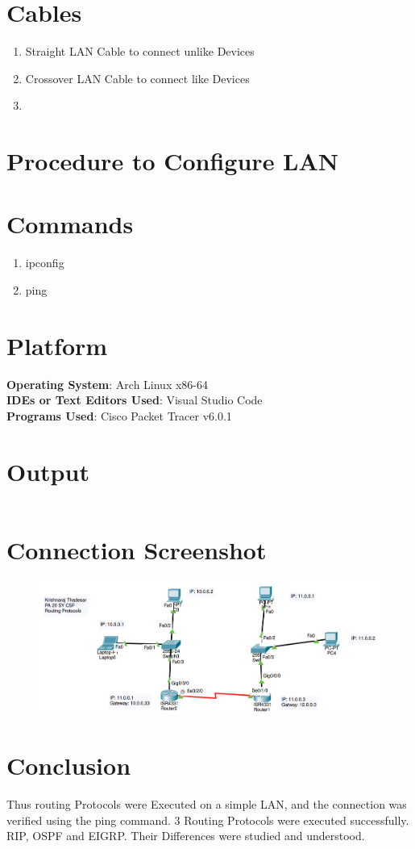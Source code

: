 \documentclass[11pt]{article}
\begin{document}
\section{Cables}
\begin{enumerate}
	\item Straight LAN Cable to connect unlike Devices
	\item Crossover LAN Cable to connect like Devices
	\item 
\end{enumerate}

\section{Procedure to Configure LAN}


\section{Commands}

\begin{enumerate}
	\item ipconfig
	\item ping
\end{enumerate}

\section{Platform}
	\textbf{Operating System}: Arch Linux x86-64\\
	\textbf{IDEs or Text Editors Used}: Visual Studio Code\\
	\textbf{Programs Used}: Cisco Packet Tracer v6.0.1

\section{Output}

\begin{lstlisting}

\end{lstlisting}

\section{Connection Screenshot}


\begin{figure}[H]
	\centering
	\includegraphics[scale=0.4]{../Screenshots/Assignment_7_screenshot.png}
\end{figure}


\section{Conclusion}
Thus routing Protocols were Executed on a simple LAN, and the connection was verified using the ping command. 3 Routing Protocols were executed successfully. RIP, OSPF and EIGRP. Their Differences were studied and understood. 
\end{document}
